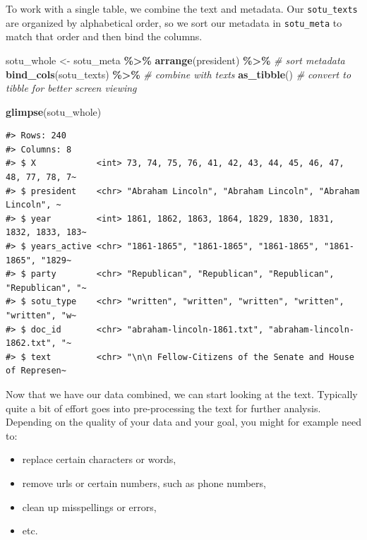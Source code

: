 \documentclass[
]{book}
\newenvironment{Shaded}{\begin{snugshade}}{\end{snugshade}}
\newcommand{\CommentTok}[1]{\textcolor[rgb]{0.56,0.35,0.01}{\textit{#1}}}
\newcommand{\FunctionTok}[1]{\textcolor[rgb]{0.13,0.29,0.53}{\textbf{#1}}}
\newcommand{\NormalTok}[1]{#1}
\newcommand{\OtherTok}[1]{\textcolor[rgb]{0.56,0.35,0.01}{#1}}
\newcommand{\SpecialCharTok}[1]{\textcolor[rgb]{0.81,0.36,0.00}{\textbf{#1}}}
\providecommand{\tightlist}{%
  \setlength{\itemsep}{0pt}\setlength{\parskip}{0pt}}
\begin{document}
To work with a single table, we combine the text and metadata. Our \texttt{sotu\_texts} are organized by alphabetical order, so we sort our metadata in \texttt{sotu\_meta} to match that order and then bind the columns.

\begin{Shaded}
\begin{Highlighting}[]
\NormalTok{sotu\_whole }\OtherTok{\textless{}{-}} 
\NormalTok{  sotu\_meta }\SpecialCharTok{\%\textgreater{}\%}  
  \FunctionTok{arrange}\NormalTok{(president) }\SpecialCharTok{\%\textgreater{}\%} \CommentTok{\# sort metadata}
  \FunctionTok{bind\_cols}\NormalTok{(sotu\_texts) }\SpecialCharTok{\%\textgreater{}\%} \CommentTok{\# combine with texts}
  \FunctionTok{as\_tibble}\NormalTok{() }\CommentTok{\# convert to tibble for better screen viewing}

\FunctionTok{glimpse}\NormalTok{(sotu\_whole)}
\end{Highlighting}
\end{Shaded}

\begin{verbatim}
#> Rows: 240
#> Columns: 8
#> $ X            <int> 73, 74, 75, 76, 41, 42, 43, 44, 45, 46, 47, 48, 77, 78, 7~
#> $ president    <chr> "Abraham Lincoln", "Abraham Lincoln", "Abraham Lincoln", ~
#> $ year         <int> 1861, 1862, 1863, 1864, 1829, 1830, 1831, 1832, 1833, 183~
#> $ years_active <chr> "1861-1865", "1861-1865", "1861-1865", "1861-1865", "1829~
#> $ party        <chr> "Republican", "Republican", "Republican", "Republican", "~
#> $ sotu_type    <chr> "written", "written", "written", "written", "written", "w~
#> $ doc_id       <chr> "abraham-lincoln-1861.txt", "abraham-lincoln-1862.txt", "~
#> $ text         <chr> "\n\n Fellow-Citizens of the Senate and House of Represen~
\end{verbatim}

Now that we have our data combined, we can start looking at the text. Typically quite a bit of effort goes into pre-processing the text for further analysis. Depending on the quality of your data and your goal, you might for example need to:

\begin{itemize}
\tightlist
\item
  replace certain characters or words,
\item
  remove urls or certain numbers, such as phone numbers,
\item
  clean up misspellings or errors,
\item
  etc.
\end{itemize}
\end{document}
